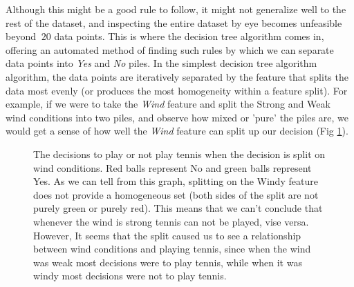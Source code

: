 Although this might be a good rule to follow, it might not generalize well to the rest of the dataset, and inspecting the entire dataset by eye becomes unfeasible beyond $~20$ data points. This is where the decision tree algorithm comes in, offering an automated method of finding such rules by which we can separate data points into \textit{Yes} and \textit{No} piles. In the simplest decision tree algorithm algorithm, the data points are iteratively separated by the feature that splits the data most evenly (or produces the most homogeneity within a feature split). For example, if we were to take the \textit{Wind} feature and split the Strong and Weak wind conditions into two piles, and observe how mixed or 'pure' the piles are, we would get a sense of how well the \textit{Wind} feature can split up our decision (Fig \ref{fig:split_on_wind}).

\begin{figure}
  \centering
    \caption{The decisions to play or not play tennis when the decision is split on wind conditions. Red balls represent No and green balls represent Yes. As we can tell from this graph, splitting on the Windy feature does not provide a homogeneous set (both sides of the split are not purely green or purely red). This means that we can't conclude that whenever the wind is strong tennis can not be played, vise versa. However, It seems that the split caused us to see a relationship between wind conditions and playing tennis, since when the wind was weak most decisions were to play tennis, while when it was windy most decisions were not to play tennis.}
    \label{fig:split_on_wind}
\end{figure}

